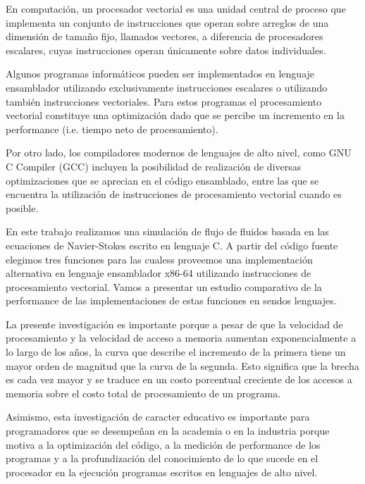 En computación, un procesador vectorial es una unidad central de proceso que implementa un conjunto de instrucciones que operan sobre arreglos de una dimensión de tamaño fijo, llamados vectores, a diferencia de procesadores escalares, cuyas instrucciones operan únicamente sobre datos individuales.
\par Algunos programas informáticos pueden ser implementados en lenguaje ensamblador utilizando exclusivamente instrucciones escalares o utilizando también instrucciones vectoriales. Para estos programas el procesamiento vectorial constituye una optimización dado que se percibe un incremento en la performance (i.e. tiempo neto de procesamiento).
\par Por otro lado, los compiladores modernos de lenguajes de alto nivel, como GNU C Compiler (GCC) incluyen la posibilidad de realización de diversas optimizaciones que se aprecian en el código ensamblado, entre las que se encuentra la utilización de instrucciones de procesamiento vectorial cuando es posible.
\par En este trabajo realizamos una simulación de flujo de fluidos basada en las ecuaciones de Navier-Stokes escrito en lenguaje C. A partir del código fuente elegimos tres funciones para las cualess proveemos una implementación alternativa en lenguaje ensamblador x86-64 utilizando instrucciones de procesamiento vectorial. Vamos a presentar un estudio comparativo de la performance de las implementaciones de estas funciones en sendos lenguajes.
\par La presente investigación es importante porque a pesar de que la velocidad de procesamiento y la velocidad de acceso a memoria aumentan exponencialmente a lo largo de los años, la curva que describe el incremento de la primera tiene un mayor orden de magnitud que la curva de la segunda. Esto significa que la brecha es cada vez mayor y se traduce en un costo porcentual creciente de los accesos a memoria sobre el costo total de procesamiento de un programa.
\par Asimismo, esta investigación de caracter educativo es importante para programadores que se desempeñan en la academia o en la industria porque motiva a la optimización del código, a la medición de performance de los programas y a la profundización del conocimiento de lo que sucede en el procesador en la ejecución programas escritos en lenguajes de alto nivel.
